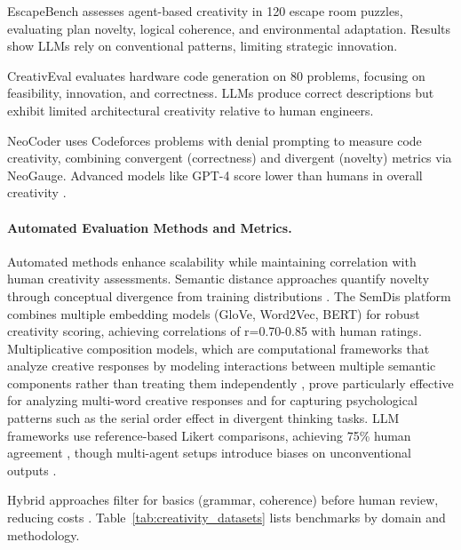 \documentclass{llncs}
\begin{document}
EscapeBench \cite{qian2025escapebench} assesses agent-based creativity in 120 escape room puzzles, evaluating plan novelty, logical coherence, and environmental adaptation. Results show LLMs rely on conventional patterns, limiting strategic innovation.

CreativEval \cite{delorenzo2024creativeval} evaluates hardware code generation on 80 problems, focusing on feasibility, innovation, and correctness. LLMs produce correct descriptions but exhibit limited architectural creativity relative to human engineers.

NeoCoder \cite{lu2025benchmarking} uses Codeforces problems with denial prompting to measure code creativity, combining convergent (correctness) and divergent (novelty) metrics via NeoGauge. Advanced models like GPT-4 score lower than humans in overall creativity \cite{lu2025benchmarking}.

\paragraph{Automated Evaluation Methods and Metrics.}

Automated methods enhance scalability while maintaining correlation with human creativity assessments. Semantic distance approaches quantify novelty through conceptual divergence from training distributions \cite{organisciak2023beyond}. The SemDis platform \cite{beaty2020automating} combines multiple embedding models (GloVe, Word2Vec, BERT) for robust creativity scoring, achieving correlations of r=0.70-0.85 with human ratings. Multiplicative composition models, which are computational frameworks that analyze creative responses by modeling interactions between multiple semantic components rather than treating them independently \cite{gray2017forward}, prove particularly effective for analyzing multi-word creative responses and for capturing psychological patterns such as the serial order effect in divergent thinking tasks. LLM frameworks use reference-based Likert comparisons, achieving 75\% human agreement \cite{li2025automated}, though multi-agent setups introduce biases on unconventional outputs \cite{franceschelli2024creativity}. 

Hybrid approaches filter for basics (grammar, coherence) before human review, reducing costs \cite{wu2024writingbench}. Table~\ref{tab:creativity_datasets} lists benchmarks by domain and methodology.
\end{document}
